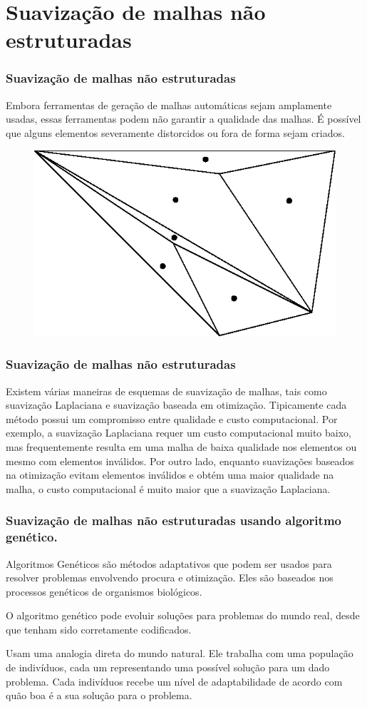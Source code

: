 \documentclass[brazil]{beamer}
\begin{document}
\section{Suavização de malhas não estruturadas}
\begin{frame}
  \frametitle{Suavização de malhas não estruturadas}
  Embora ferramentas de geração de malhas automáticas sejam amplamente usadas, essas ferramentas podem não garantir a qualidade das malhas. É possível que alguns elementos severamente distorcidos ou fora de forma sejam criados.

  \begin{figure}
    \includegraphics[width=0.4\linewidth]{variacao_brusca.eps}
  \end{figure}
\end{frame}

\begin{frame}
  \frametitle{Suavização de malhas não estruturadas}

  Existem várias maneiras de esquemas de suavização de malhas, tais como suavização Laplaciana e suavização baseada em otimização. Tipicamente cada método possui um compromisso entre qualidade e custo computacional. Por exemplo, a suavização Laplaciana requer um custo computacional muito baixo, mas frequentemente resulta em uma malha de baixa qualidade nos elementos ou mesmo com elementos inválidos. Por outro lado, enquanto suavizações baseados na otimização evitam elementos inválidos e obtém uma maior qualidade na malha, o custo computacional é muito maior que a suavização Laplaciana.

\end{frame}

\begin{frame}
  \frametitle{Suavização de malhas não estruturadas usando algoritmo genético.}

  Algoritmos Genéticos são métodos adaptativos que podem ser usados para resolver problemas envolvendo procura e otimização. Eles são baseados nos processos genéticos de organismos biológicos.

  O algoritmo genético pode evoluir soluções para problemas do mundo real, desde que tenham sido corretamente codificados.

  Usam uma analogia direta do mundo natural. Ele trabalha com uma população de indivíduos, cada um representando uma possível solução para um dado problema. Cada indivíduos recebe um nível de adaptabilidade de acordo com quão boa é a sua solução para o problema.

\end{frame}
\end{document}
